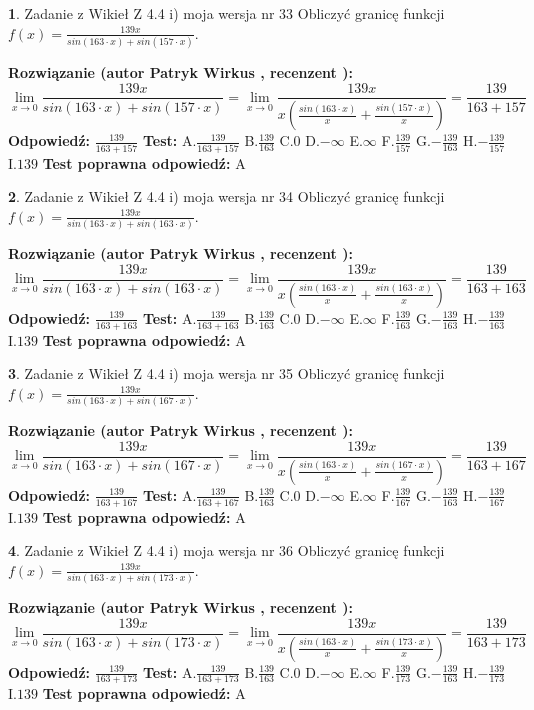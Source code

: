 \documentclass[12pt, a4paper]{article}
\theoremstyle{definition} %
\newtheorem{zad}{}
\newcommand{\zadStart}[1]{\begin{zad}#1\newline}
\newcommand{\zadStop}{\end{zad}}
\newcommand{\rozwStart}[2]{\noindent \textbf{Rozwiązanie (autor #1 , recenzent #2): }\newline}
\newcommand{\rozwStop}{\newline}
\newcommand{\odpStart}{\noindent \textbf{Odpowiedź:}\newline}
\newcommand{\odpStop}{\newline}
\newcommand{\testStart}{\noindent \textbf{Test:}\newline}
\newcommand{\testStop}{\newline}
\newcommand{\kluczStart}{\noindent \textbf{Test poprawna odpowiedź:}\newline}
\newcommand{\kluczStop}{\newline}
\begin{document}
\zadStart{Zadanie z Wikieł Z 4.4 i) moja wersja nr 33}
Obliczyć granicę funkcji $f(x)=\frac{139x}{sin(163\cdot x) +sin(157\cdot x)}$.
\zadStop
\rozwStart{Patryk Wirkus}{}
$$\lim\limits_{x\to 0}\frac{139x}{sin(163\cdot x) +sin(157\cdot x)}=\lim\limits_{x\to 0}\frac{139x}{x(\frac{sin(163\cdot x)}{x}+\frac{sin(157\cdot x)}{x})}=\frac{139}{163+157}$$
\rozwStop
\odpStart
$\frac{139}{163+157}$
\odpStop
\testStart
A.$\frac{139}{163+157}$
B.$\frac{139}{163}$
C.$0$
D.$-\infty$
E.$\infty$
F.$\frac{139}{157}$
G.$-\frac{139}{163}$
H.$-\frac{139}{157}$
I.$139$
\testStop
\kluczStart
A
\kluczStop



\zadStart{Zadanie z Wikieł Z 4.4 i) moja wersja nr 34}
Obliczyć granicę funkcji $f(x)=\frac{139x}{sin(163\cdot x) +sin(163\cdot x)}$.
\zadStop
\rozwStart{Patryk Wirkus}{}
$$\lim\limits_{x\to 0}\frac{139x}{sin(163\cdot x) +sin(163\cdot x)}=\lim\limits_{x\to 0}\frac{139x}{x(\frac{sin(163\cdot x)}{x}+\frac{sin(163\cdot x)}{x})}=\frac{139}{163+163}$$
\rozwStop
\odpStart
$\frac{139}{163+163}$
\odpStop
\testStart
A.$\frac{139}{163+163}$
B.$\frac{139}{163}$
C.$0$
D.$-\infty$
E.$\infty$
F.$\frac{139}{163}$
G.$-\frac{139}{163}$
H.$-\frac{139}{163}$
I.$139$
\testStop
\kluczStart
A
\kluczStop



\zadStart{Zadanie z Wikieł Z 4.4 i) moja wersja nr 35}
Obliczyć granicę funkcji $f(x)=\frac{139x}{sin(163\cdot x) +sin(167\cdot x)}$.
\zadStop
\rozwStart{Patryk Wirkus}{}
$$\lim\limits_{x\to 0}\frac{139x}{sin(163\cdot x) +sin(167\cdot x)}=\lim\limits_{x\to 0}\frac{139x}{x(\frac{sin(163\cdot x)}{x}+\frac{sin(167\cdot x)}{x})}=\frac{139}{163+167}$$
\rozwStop
\odpStart
$\frac{139}{163+167}$
\odpStop
\testStart
A.$\frac{139}{163+167}$
B.$\frac{139}{163}$
C.$0$
D.$-\infty$
E.$\infty$
F.$\frac{139}{167}$
G.$-\frac{139}{163}$
H.$-\frac{139}{167}$
I.$139$
\testStop
\kluczStart
A
\kluczStop



\zadStart{Zadanie z Wikieł Z 4.4 i) moja wersja nr 36}
Obliczyć granicę funkcji $f(x)=\frac{139x}{sin(163\cdot x) +sin(173\cdot x)}$.
\zadStop
\rozwStart{Patryk Wirkus}{}
$$\lim\limits_{x\to 0}\frac{139x}{sin(163\cdot x) +sin(173\cdot x)}=\lim\limits_{x\to 0}\frac{139x}{x(\frac{sin(163\cdot x)}{x}+\frac{sin(173\cdot x)}{x})}=\frac{139}{163+173}$$
\rozwStop
\odpStart
$\frac{139}{163+173}$
\odpStop
\testStart
A.$\frac{139}{163+173}$
B.$\frac{139}{163}$
C.$0$
D.$-\infty$
E.$\infty$
F.$\frac{139}{173}$
G.$-\frac{139}{163}$
H.$-\frac{139}{173}$
I.$139$
\testStop
\kluczStart
A
\kluczStop
\end{document}
